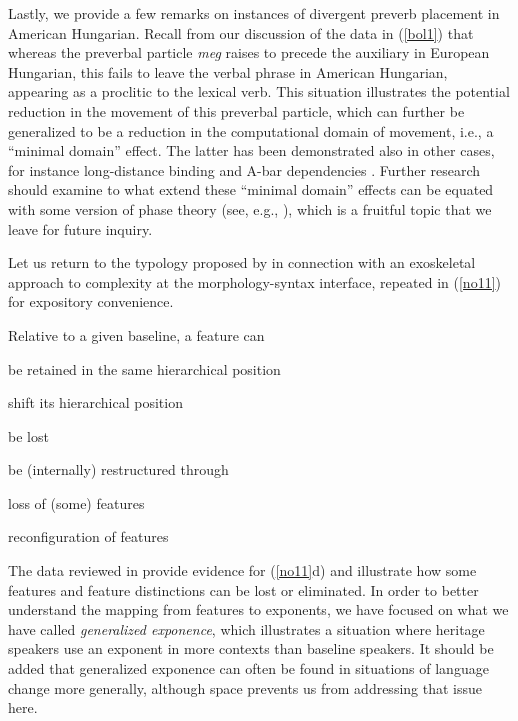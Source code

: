 \documentclass[output=paper,colorlinks,citecolor=brown,footheight=42pt]{langscibook}
\begin{document}
Lastly, we provide a few remarks on instances of divergent preverb placement in American Hungarian. Recall from our discussion of the data in (\ref{bol1}) that whereas the preverbal particle \textit{meg} raises to precede the auxiliary in European Hungarian, this fails to leave the verbal phrase in American Hungarian, appearing as a proclitic to the lexical verb. This situation illustrates the potential reduction in the movement of this preverbal particle, which can further be generalized to be a reduction in the computational domain of movement, i.e., a “minimal domain” effect. The latter has been demonstrated also in other cases, for instance long-distance binding \citep{gurel2007, kimetal2009, mikebirna2015, Montrul2016} and A-bar dependencies \citep{hoppetalwh}. Further research should examine to what extend these “minimal domain” effects can be equated with some version of phase theory (see, e.g., \citealt{chomsky2000, chomsky2001, gallego2010}), which is a fruitful topic that we leave for future inquiry.

Let us return to the typology proposed by \citet{lohnput21} in connection with an exoskeletal approach to complexity at the morphology-syntax interface, repeated in (\ref{no11}) for expository convenience.

\begin{exe}
\ex\label{no11} Relative to a given baseline, a feature can
\begin{xlist}
        \item be retained in the same hierarchical position
        \item shift its hierarchical position
        \item be lost
        \item be (internally) restructured through
        \begin{xlist}
        \item loss of (some) features
        \item reconfiguration of features
        \end{xlist}
\end{xlist}
\end{exe}

The data reviewed in  provide evidence for (\ref{no11}d) and illustrate how some features and feature distinctions can be lost or eliminated. In order to better understand the mapping from features to exponents, we have focused on what we have called \textit{generalized exponence}, which illustrates a situation where heritage speakers use an exponent in more contexts than baseline speakers. It should be added that generalized exponence can often be found in situations of language change more generally, although space prevents us from addressing that issue here.
\end{document}
